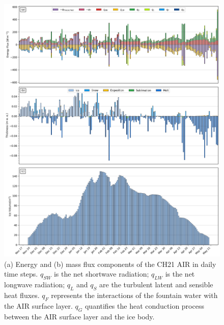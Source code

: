 \documentclass[utf8]{frontiersSCNS} %
\begin{document}
\begin{figure} \begin{center} \includegraphics[width=\linewidth]{Figures/Model_Output.jpg} \end{center}
\caption{(a) Energy and (b) mass flux components of the CH21 AIR in daily time steps.  $q_{SW}$ is the
    net shortwave radiation; $q_{LW}$ is the net longwave radiation; $q_{L}$ and $q_{S}$ are the turbulent latent and
    sensible heat fluxes. $q_{F}$ represents the interactions of the fountain water with the AIR surface layer.  $q_{G}$
    quantifies the heat conduction process between the AIR surface layer and the ice body. } \label{fig:EB} \end{figure}

  
\end{document}
